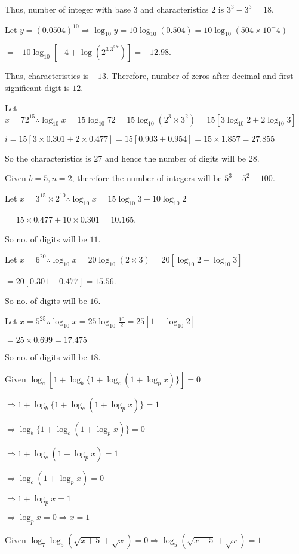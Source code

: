   Thus, number of integer with base $3$ and characteristics $2$ is $3^3 - 3^3 = 18$.
\item Let $y = (0.0504)^{10} \Rightarrow \log_{10}y = 10\log_{10}(0.504) = 10\log_{10}(504\times10^-4)$

  $= -10\log_{10}[-4 + \log(2^3.3^2.7)] = -12.98$.

  Thus, characteristics is $-13$. Therefore, number of zeros after decimal and first significant digit is $12$.
\item Let $x = 72^{15} \therefore \log_{10}x = 15\log_{10}72 = 15\log_{10}(2^3\times3^2) = 15[3\log_{10}2 + 2\log_{10}3]$

  $i = 15[3\times0.301 + 2\times0.477] = 15[0.903 + 0.954] = 15\times1.857 = 27.855$

  So the characteristics is $27$ and hence the number of digits will be $28$.
\item Given $b = 5, n = 2$, therefore the number of integers will be $5^3 - 5^2 - 100$.
\item Let $x = 3^{15}\times 2^{10} \therefore \log_{10}x = 15\log_{10}3 + 10\log_{10}2$

  $= 15\times0.477 + 10\times 0.301 = 10.165$.

  So no. of digits will be $11$.
\item Let $x = 6^{20} \therefore \log_{10}x = 20\log_{10}(2\times3) = 20[\log_{10}2 + \log_{10}3]$

  $= 20[0.301 + 0.477] = 15.56$.

  So no. of digits will be $16$.
\item Let $x = 5^{25} \therefore \log_{10}x = 25\log_{10}\frac{10}{2}= 25[1 - \log_{10}2]$

  $= 25\times 0.699 = 17.475$

  So no. of digits will be $18$.
\item Given $\log_a[1 + \log_b\{1 + \log_c(1 + \log_px)\}] = 0$

  $\Rightarrow 1 + \log_b\{1 + \log_c(1 + \log_px)\} = 1$

  $\Rightarrow \log_b\{1 + \log_c(1 + \log_px)\} = 0$

  $\Rightarrow 1 + \log_c(1 + \log_px) = 1$

  $\Rightarrow \log_c(1 + \log_px) = 0$

  $\Rightarrow 1 + \log_px = 1$

  $\Rightarrow \log_px = 0 \Rightarrow x = 1$
\item Given $\log_7\log_5(\sqrt{x + 5} + \sqrt{x}) = 0 \Rightarrow \log_5(\sqrt{x + 5} + \sqrt{x}) = 1$

